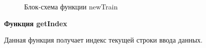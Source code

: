 \documentclass[14pt,a4paper]{extreport}
\begin{document}
    \begin{figure}[h]
    \caption{Блок-схема функции newTrain}
    \label{ris:image}
    \end{figure}
    \newpage \par \small \textbf{Функция getIndex}
    \\ \par Данная функция получает индекс текущей строки ввода данных.
\end{document}
